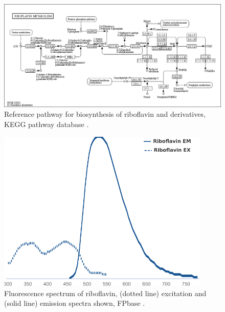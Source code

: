 \begin{figure}
  \centering
  \includegraphics[width=1.0\textwidth]{kegg-flavin}
  \caption[
    Reference pathway for biosynthesis of riboflavin and derivatives
  ]{
    Reference pathway for biosynthesis of riboflavin and derivatives, KEGG pathway database \parencite{kanehisaKEGGTaxonomybasedAnalysis2023}.
    }
  \label{fig:intro-flavin-kegg}
\end{figure}

\begin{figure}
  \centering
  \includegraphics[width=0.9\textwidth]{fpbase-riboflavin-adapted}
  \caption[
    Fluorescence spectrum of riboflavin
  ]{
    Fluorescence spectrum of riboflavin, (dotted line) excitation and (solid line) emission spectra shown, FPbase \parencite{lambertUsingFPbaseFluorescent2023}.
    }
  \label{fig:intro-flavin-spectra}
\end{figure}

